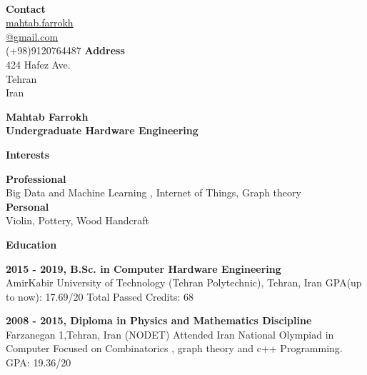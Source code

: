 \documentclass[a4paper,12pt,final]{memoir}
\newcommand{\Sep}{\vspace{1.5em}}
\newcommand{\SmallSep}{\vspace{0.5em}}
\newenvironment{AboutMe}
	{\ignorespaces\textbf{\color{RoyalBlue} About me}}
	{\Sep\ignorespacesafterend}
\newcommand{\CVSection}[1]
	{\Large\textbf{#1}\par
	\SmallSep\normalsize\normalfont}
\newcommand{\CVItem}[1]
	{\textbf{\color{RoyalBlue} #1}}
\begin{document}


\begin{flushright}\small

	
	 \CVItem{\\ Contact} \\
	 
	\href{mailto://mahtab.farrokh@gmail.com}{mahtab.farrokh\\ @gmail.com}  \\
	(+98)9120764487 
	\CVItem{Address} \\
	424 Hafez Ave. \\
	Tehran\\
	Iran
	
\end{flushright}\normalsize
\framebreak



\Huge\bfseries {\color{RoyalBlue} Mahtab Farrokh} \\
\Large\bfseries  Undergraduate Hardware Engineering \\

\normalsize\normalfont


\CVSection{Interests}
	\CVItem{Professional}
	\\
	Big Data and Machine Learning , Internet of Things, Graph theory
	\\
	\CVItem{Personal}
	\\
	Violin, Pottery, Wood Handcraft
	
\Sep

\CVSection{Education}
\CVItem{2015 - 2019, B.Sc. in Computer Hardware Engineering}\\
AmirKabir University of Technology (Tehran Polytechnic), Tehran, Iran
GPA(up to now): 17.69/20
Total Passed Credits: 68
\SmallSep

\CVItem{2008 - 2015, Diploma in Physics and Mathematics Discipline}\\
Farzanegan 1,Tehran, Iran (NODET)
Attended Iran National Olympiad in Computer Focused on Combinatorics
, graph theory and c++ Programming.
GPA: 19.36/20
\Sep
\end{document}
